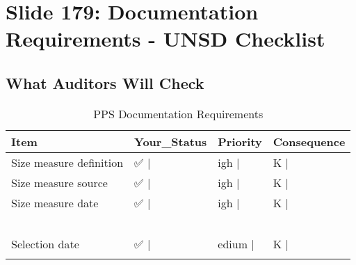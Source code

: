 \documentclass[
]{article}
\begin{document}
\section{Slide 179: Documentation Requirements - UNSD
Checklist}\label{slide-179-documentation-requirements---unsd-checklist}

\subsection{What Auditors Will Check}\label{what-auditors-will-check}

\begin{longtable}[t]{llll}
\caption{\label{tab:pps-documentation}PPS Documentation Requirements}\\
\toprule
Item & Your\_Status & Priority & Consequence\\
\midrule
Size measure definition & ✅          | & igh     | & K                     |\\
Size measure source & ✅          | & igh     | & K                     |\\
Size measure date & ✅          | & igh     | & K                     |\\
\cellcolor[HTML]{fff3cd}{Selection algorithm used} & \cellcolor[HTML]{fff3cd}{⚠️} & \cellcolor[HTML]{fff3cd}{|Critical} & \cellcolor[HTML]{fff3cd}{|Reproducibility issues}\\
\cellcolor[HTML]{ffcccc}{Random seed/start} & \cellcolor[HTML]{ffcccc}{❌          |} & \cellcolor[HTML]{ffcccc}{ritical |} & \cellcolor[HTML]{ffcccc}{annot replicate       |}\\
\addlinespace
\cellcolor[HTML]{ffcccc}{Certainty units list} & \cellcolor[HTML]{ffcccc}{❌          |} & \cellcolor[HTML]{ffcccc}{igh     |} & \cellcolor[HTML]{ffcccc}{eight problems        |}\\
\cellcolor[HTML]{ffcccc}{Replacement protocol} & \cellcolor[HTML]{ffcccc}{❌          |} & \cellcolor[HTML]{ffcccc}{edium   |} & \cellcolor[HTML]{ffcccc}{ias if replacements   |}\\
\cellcolor[HTML]{ffcccc}{Software version} & \cellcolor[HTML]{ffcccc}{❌          |} & \cellcolor[HTML]{ffcccc}{ow      |} & \cellcolor[HTML]{ffcccc}{inor                  |}\\
Selection date & ✅          | & edium   | & K                     |\\
\cellcolor[HTML]{ffcccc}{Quality checks performed} & \cellcolor[HTML]{ffcccc}{❌          |} & \cellcolor[HTML]{ffcccc}{igh     |} & \cellcolor[HTML]{ffcccc}{uality doubts         |}\\
\bottomrule
\end{longtable}
\end{document}
